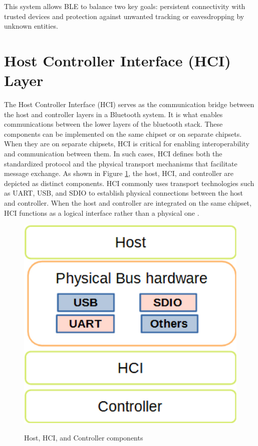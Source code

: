 This system allows BLE to balance two key goals: persistent connectivity with trusted devices and protection against unwanted tracking or eavesdropping by unknown entities.

\section{Host Controller Interface (HCI) Layer}

The Host Controller Interface (HCI) serves as the communication bridge between the host and controller layers in a Bluetooth system. It is what enables communications between the lower layers of the bluetooth stack. These components can be implemented on the same chipset or on separate chipsets. When they are on separate chipsets, HCI is critical for enabling interoperability and communication between them. In such cases, HCI defines both the standardized protocol and the physical transport mechanisms that facilitate message exchange. As shown in Figure \ref{fig:hosthcicontroller}, the host, HCI, and controller are depicted as distinct components. HCI commonly uses transport technologies such as UART, USB, and SDIO to establish physical connections between the host and controller. When the host and controller are integrated on the same chipset, HCI functions as a logical interface rather than a physical one \cite{introtoble}.
\begin{figure}[H]
    \centering
    \caption{Host, HCI, and Controller components}
    \includegraphics[scale=.35]{hosthcicontroller.png}
    \label{fig:hosthcicontroller}
    \end{figure}

